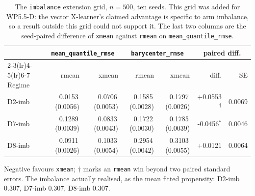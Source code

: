 \begin{table}[htbp]
\centering
\caption{The \texttt{imbalance} extension grid, $n=500$, ten seeds. This grid was added for WP5.5-D: the vector X-learner's claimed advantage is specific to arm imbalance, so a result outside this grid could not support it. The last two columns are the seed-paired difference of \texttt{xmean} against \texttt{rmean} on \texttt{mean\_quantile\_rmse}.}
\label{tab:p55-imbalance}
\small
\begin{tabular}{@{}lrrrrrr@{}}
\toprule
& \multicolumn{2}{c}{\texttt{mean\_quantile\_rmse}} & \multicolumn{2}{c}{\texttt{barycenter\_rmse}} & \multicolumn{2}{c}{paired diff.} \\
\cmidrule(lr){2-3}\cmidrule(lr){4-5}\cmidrule(lr){6-7}
Regime & rmean & xmean & rmean & xmean & diff. & SE \\
\midrule
D2-imb & 0.0153\,(0.0056) & 0.0706\,(0.0053) & 0.1585\,(0.0028) & 0.1797\,(0.0026) & +0.0553$^{\dagger}$ & 0.0069 \\
D7-imb & 0.1289\,(0.0039) & 0.0833\,(0.0043) & 0.1722\,(0.0030) & 0.1785\,(0.0039) & -0.0456$^{\ast}$ & 0.0046 \\
D8-imb & 0.0911\,(0.0026) & 0.1033\,(0.0054) & 0.2954\,(0.0042) & 0.3103\,(0.0055) & +0.0121 & 0.0064 \\
\bottomrule
\end{tabular}
\par\vspace{2pt}\parbox{0.9\textwidth}{\scriptsize Negative favours \texttt{xmean}; $\dagger$ marks an \texttt{rmean} win beyond two paired standard errors. The imbalance actually realised, as the mean fitted propensity: D2-imb 0.307, D7-imb 0.307, D8-imb 0.307.}
\end{table}

